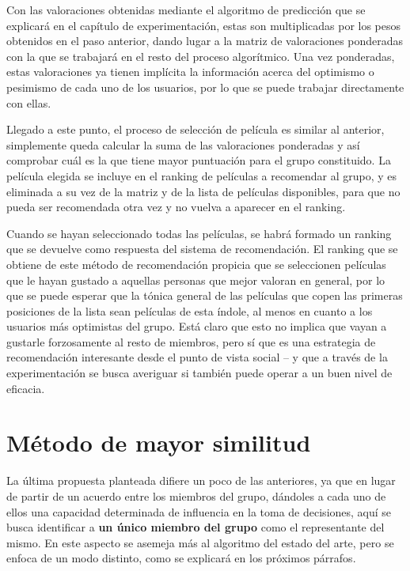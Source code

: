 Con las valoraciones obtenidas mediante el algoritmo de predicción que se explicará en el capítulo de experimentación, estas son multiplicadas por los pesos obtenidos en el paso anterior, dando lugar a la matriz de valoraciones ponderadas con la que se trabajará en el resto del proceso algorítmico. Una vez ponderadas, estas valoraciones ya tienen implícita la información acerca del optimismo o pesimismo de cada uno de los usuarios, por lo que se puede trabajar directamente con ellas.

Llegado a este punto, el proceso de selección de película es similar al anterior, simplemente queda calcular la suma de las valoraciones ponderadas y así comprobar cuál es la que tiene mayor puntuación para el grupo constituido. La película elegida se incluye en el ranking de películas a recomendar al grupo, y es eliminada a su vez de la matriz y de la lista de películas disponibles, para que no pueda ser recomendada otra vez y no vuelva a aparecer en el ranking.

Cuando se hayan seleccionado todas las películas, se habrá formado un ranking que se devuelve como respuesta del sistema de recomendación. El ranking que se obtiene de este método de recomendación propicia que se seleccionen películas que le hayan gustado a aquellas personas que mejor valoran en general, por lo que se puede esperar que la tónica general de las películas que copen las primeras posiciones de la lista sean películas de esta índole, al menos en cuanto a los usuarios más optimistas del grupo. Está claro que esto no implica que vayan a gustarle forzosamente al resto de miembros, pero sí que es una estrategia de recomendación interesante desde el punto de vista social -- y que a través de la experimentación se busca averiguar si también puede operar a un buen nivel de eficacia.

\section{Método de mayor similitud}

La última propuesta planteada difiere un poco de las anteriores, ya que en lugar de partir de un acuerdo entre los miembros del grupo, dándoles a cada uno de ellos una capacidad determinada de influencia en la toma de decisiones, aquí se busca identificar a \textbf{un único miembro del grupo} como el representante del mismo. En este aspecto se asemeja más al algoritmo del estado del arte, pero se enfoca de un modo distinto, como se explicará en los próximos párrafos.

